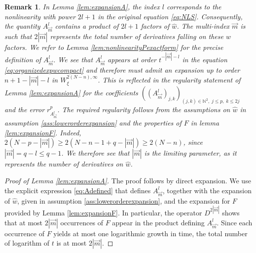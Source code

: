 \documentclass[a4paper, 15pt]{article}
\numberwithin{equation}{section}
\newtheorem{rem}[defi]{Remark}
\begin{document}
\begin{rem}
In Lemma \ref{lem:expansionA}, the index $l$ corresponds to the nonlinearity with power $2l+1$ in the original equation \eqref{eq:NLS}. Consequently, the quantity $A^l_{\overrightarrow{m}}$ contains a product of $2l+1$ factors of $\hat{w}$. The multi-index $\overrightarrow{m}$ is such that $2|\overrightarrow{m}|$ represents the total number of derivatives falling on these $\hat{w}$ factors. We refer to Lemma \ref{lem:nonlinearityPexactform} for the precise definition of $A^l_{\overrightarrow{m}}$. We see that $A^l_{\overrightarrow{m}}$ appears at order $t^{-|\overrightarrow{m}|-l}$ in the equation \eqref{eq:organizedexpwcompact} and therefore must admit an expansion up to order $n+1-|\overrightarrow{m}|-l$ in $W^{2(N-n),\infty}_\xi$. This is reflected in the regularity statement of Lemma \ref{lem:expansionA} for the coefficients $((A^l_{\overrightarrow{m}})_{j,k})_{(j,k)\in\mathbb{N}^{2},\;j\leq p,\;k\leq 2j}$ and the error $r^p_{A^l_{\overrightarrow{m}}}$. The required regularity follows from the assumptions on $\hat{w}$ in assumption \ref{ass:lowerorderexpansion} and the properties of $F$ in lemma \ref{lem:expansionF}. Indeed, $2(N-p-|\overrightarrow{m}|)\geq 2(N-n-1+q-|\overrightarrow{m}|)\geq2(N-n)$, since $|\overrightarrow{m}|=q-l\leq q-1$. We therefore see that $|\overrightarrow{m}|$ is the limiting parameter, as it represents the number of derivatives on $\hat{w}$.
\end{rem}
\begin{proof}[Proof of Lemma \ref{lem:expansionA}]
The proof follows by direct expansion. We use the explicit expression  \eqref{eq:Adefined} that defines $A^l_{\overrightarrow{m}}$, together with the expansion of $\hat{w}$, given in assumption \ref{ass:lowerorderexpansion}, and the expansion for $F$ provided by Lemma \ref{lem:expansionF}. In particular, the operator $D^{2|\overrightarrow{m}|}$ shows that at most  $2|\overrightarrow{m}|$ occurrences of $F$ appear in the product defining $A^l_{\overrightarrow{m}}$. Since each occurrence of $F$ yields at most one logarithmic growth in time, the total number of logarithm of $t$ is at most $2|\overrightarrow{m}|$. 
\end{proof}
\end{document}
